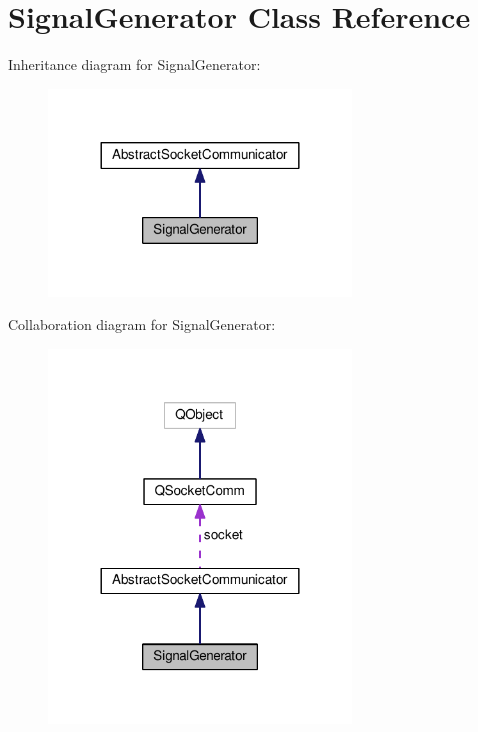 \hypertarget{class_signal_generator}{\section{Signal\+Generator Class Reference}
\label{class_signal_generator}
}


Inheritance diagram for Signal\+Generator\+:\nopagebreak
\begin{figure}[H]
\begin{center}
\leavevmode
\includegraphics[width=228pt]{class_signal_generator__inherit__graph}
\end{center}
\end{figure}


Collaboration diagram for Signal\+Generator\+:\nopagebreak
\begin{figure}[H]
\begin{center}
\leavevmode
\includegraphics[width=228pt]{class_signal_generator__coll__graph}
\end{center}
\end{figure}
